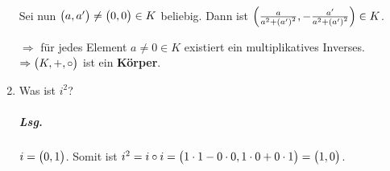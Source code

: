 \documentclass{scrreprt}
\begin{document}
\begin{enumerate}[(1)]
  Sei nun $\qty\big(a, a') \ne \qty\big(0, 0) \in K$ beliebig.
  Dann ist
  $\qty(\frac{a}{a^2 + \qty(a')^2}, -\frac{a'}{a^2 + \qty(a')^2}) \in K$.
  $\Rightarrow$ für jedes Element $a \ne 0 \in K$ existiert ein multiplikatives
  Inverses. \\
  $\Rightarrow \qty\big(K, +, \circ)$ ist ein \textbf{Körper}.

\item Was ist $i^2$?

  \subparagraph{Lsg.} $i = \qty\big(0, 1)$.
  Somit ist $i^2 = i \circ i =
  \qty\big(1 \cdot 1 - 0 \cdot 0, 1 \cdot 0 + 0 \cdot 1) = \qty\big(1, 0)$.
\end{enumerate}
\end{document}

